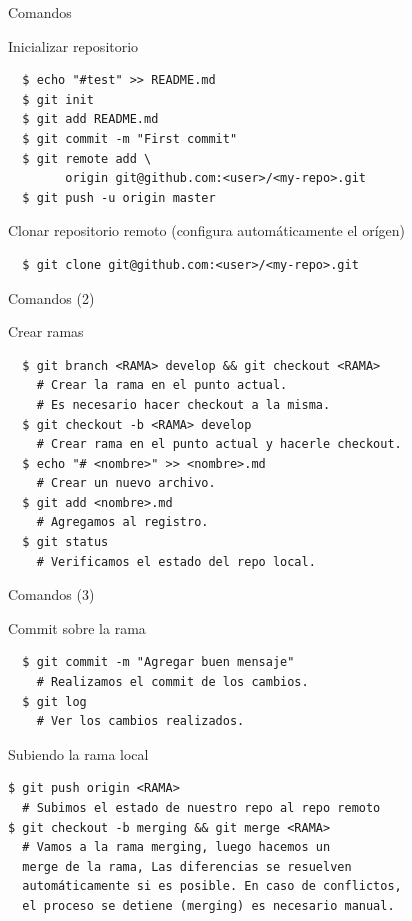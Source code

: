\documentclass{beamer}
\begin{document}
\begin{frame}[fragile]{Comandos}
  \begin{block}{Inicializar repositorio}
    \begin{verbatim}
  $ echo "#test" >> README.md
  $ git init
  $ git add README.md
  $ git commit -m "First commit"
  $ git remote add \
  		origin git@github.com:<user>/<my-repo>.git
  $ git push -u origin master
    \end{verbatim}
  \end{block} \pause
  
  \begin{block}{Clonar repositorio remoto (configura automáticamente el orígen)}
    \begin{verbatim}
  $ git clone git@github.com:<user>/<my-repo>.git
    \end{verbatim}
  \end{block}
  
\end{frame}

\begin{frame}[fragile]{Comandos (2)}
  \begin{block}{Crear ramas}
    \begin{verbatim}
  $ git branch <RAMA> develop && git checkout <RAMA>
    # Crear la rama en el punto actual.                 
    # Es necesario hacer checkout a la misma.
  $ git checkout -b <RAMA> develop 
    # Crear rama en el punto actual y hacerle checkout.
  $ echo "# <nombre>" >> <nombre>.md
    # Crear un nuevo archivo.
  $ git add <nombre>.md
    # Agregamos al registro.
  $ git status
    # Verificamos el estado del repo local.
    \end{verbatim}
  \end{block}
\end{frame}

\begin{frame}[fragile]{Comandos (3)}
  \begin{block}{Commit sobre la rama}
    \begin{verbatim}
  $ git commit -m "Agregar buen mensaje"
    # Realizamos el commit de los cambios.
  $ git log
    # Ver los cambios realizados.
    \end{verbatim}
  \end{block} \pause
  
  \begin{block}{Subiendo la rama local}
    \begin{verbatim}
$ git push origin <RAMA>
  # Subimos el estado de nuestro repo al repo remoto
$ git checkout -b merging && git merge <RAMA>
  # Vamos a la rama merging, luego hacemos un 
  merge de la rama, Las diferencias se resuelven 
  automáticamente si es posible. En caso de conflictos,
  el proceso se detiene (merging) es necesario manual.
  \end{verbatim}
  \end{block}
\end{frame}
\end{document}
